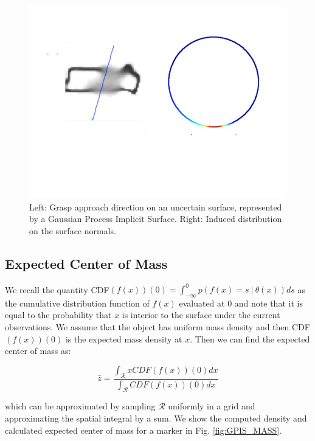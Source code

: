 \documentclass[letterpaper, 10 pt, conference]{ieeeconf}  %
\begin{document}
\begin{figure}[ht!]
\centering
\includegraphics[scale = 0.3]{figures/Slide05.jpg}
\caption{Left: Grasp approach direction on an uncertain surface, represented by a Gaussian Process Implicit Surface.
Right: Induced distribution on the surface normals.}
\vspace*{-10pt}
\label{fig:GraspSurfaceNormals}
\end{figure}

\subsection{Expected Center of Mass} 

We recall the quantity CDF$(f(x))(0) = \int_{-\infty}^{0} p(f(x) =  s \ | \ \theta(x)) ds$ as the cumulative distribution function of $f(x)$ evaluated at 0 and note that it is equal to the probability that $x$ is interior to the surface under the current observations.
We assume that the object has uniform mass density and then CDF$(f(x))(0)$ is the expected mass density at $x$.
Then we can find the expected center of mass as:

\begin{equation}
  \bar{z} 
  =
  \frac
    {\int_{\mathcal{R}}x CDF(f(x))(0) dx}
    {\int_{\mathcal{R}}  CDF(f(x))(0) dx}
\end{equation}

which can be approximated by sampling $\mathcal{R}$ uniformly in a grid and approximating the spatial integral by a sum. We show the computed density and calculated expected center of mass for a marker in Fig. \ref{fig:GPIS_MASS}.
\end{document}
